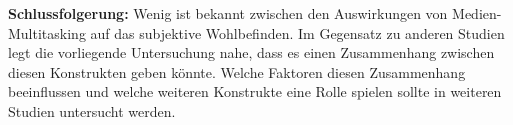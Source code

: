 \par 
\textbf{Schlussfolgerung:} Wenig ist bekannt zwischen den Auswirkungen von Medien-Multitasking auf das subjektive Wohlbefinden. Im Gegensatz zu anderen Studien legt die vorliegende Untersuchung nahe, dass es einen Zusammenhang zwischen diesen Konstrukten geben könnte. Welche Faktoren diesen Zusammenhang beeinflussen und welche weiteren Konstrukte eine Rolle spielen sollte in weiteren Studien untersucht werden. 


